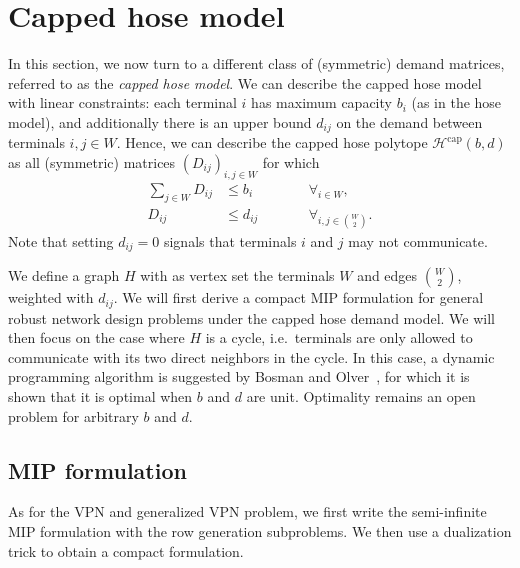 \section{Capped hose model}
In this section, we now turn to a different class of (symmetric) demand matrices, referred to as the \emph{capped hose model}.
We can describe the capped hose model with linear constraints: each terminal $i$ has maximum capacity $b_i$ (as in the hose model), and additionally there is an upper bound $d_{ij}$ on the demand between terminals $i,j \in W$.
Hence, we can describe the capped hose polytope $\mathcal H^\text{cap}(b, d)$ as all (symmetric) matrices $(D_{ij})_{i,j \in W}$ for which
\[
    \begin{split}
        \sum_{j \in W} D_{ij} &\le b_i \qquad&&\forall_{i \in W}, \\
        D_{ij} &\le d_{ij} \qquad&&\forall_{i,j \in \binom W 2}.
    \end{split}
\]
Note that setting $d_{ij} = 0$ signals that terminals $i$ and $j$ may not communicate.

We define a graph $H$ with as vertex set the terminals $W$ and edges $\binom W 2$, weighted with $d_{ij}$.
We will first derive a compact MIP formulation for general robust network design problems under the capped hose demand model.
We will then focus on the case where $H$ is a cycle, i.e.\ terminals are only allowed to communicate with its two direct neighbors in the cycle.
In this case, a dynamic programming algorithm is suggested by Bosman and Olver~\cite{bosman2017exploring}, for which it is shown that it is optimal when $b$ and $d$ are unit.
Optimality remains an open problem for arbitrary $b$ and $d$.

\subsection{MIP formulation}
As for the VPN and generalized VPN problem, we first write the semi-infinite MIP formulation with the row generation subproblems.
We then use a dualization trick to obtain a compact formulation.

